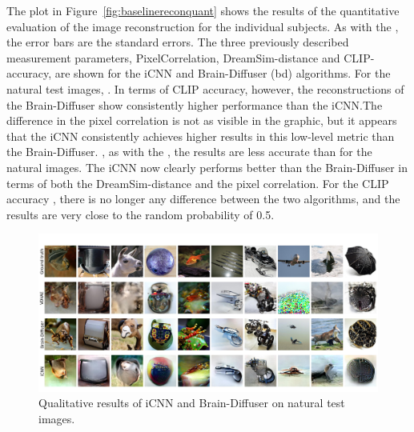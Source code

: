 The plot in Figure~\ref{fig:baselinereconquant} shows the results of the quantitative evaluation of the image reconstruction for the individual subjects. As with the , the error bars are the standard errors. The three previously described measurement parameters, PixelCorrelation, DreamSim-distance and CLIP-accuracy, are shown for the iCNN and Brain-Diffuser (bd) algorithms. For the natural test images, . In terms of CLIP accuracy, however, the reconstructions of the Brain-Diffuser show consistently higher performance than the iCNN.\@ The difference in the pixel correlation is not as visible in the graphic, but it appears that the iCNN consistently achieves higher results in this low-level metric than the Brain-Diffuser. , as with the , the results are  less accurate than for the natural images. The iCNN now clearly performs better than the Brain-Diffuser in terms of both the DreamSim-distance and the pixel correlation. For the CLIP accuracy , there is no longer any  difference between the two algorithms, and the results are very close to the random probability of 0.5. 


\begin{figure}[ht]
    \centering
    \includegraphics[width=1\textwidth]{plots/baseline_qual_recon_test.JPEG}
    \caption[Reconstructed images for iCNN and Brain-Diffuser on natural test images]{Qualitative results of iCNN and Brain-Diffuser on natural test images. }\label{fig:baselinerecontestqual}
\end{figure}

